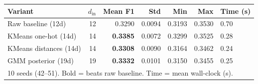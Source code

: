 \begin{tabular}{lrrrrrl}
\toprule
Variant & $d_{\mathrm{in}}$ & Mean F1 & Std & Min & Max & Time (s) \\
\midrule
Raw baseline (12d) & 12 & 0.3290 & 0.0094 & 0.3193 & 0.3530 & 0.70 \\
\midrule
KMeans one-hot (14d) & 14 & \textbf{0.3385} & 0.0072 & 0.3299 & 0.3525 & 0.28 \\
KMeans distances (14d) & 14 & \textbf{0.3308} & 0.0090 & 0.3164 & 0.3462 & 0.24 \\
GMM posterior (19d) & 19 & \textbf{0.3332} & 0.0101 & 0.3150 & 0.3455 & 0.25 \\
\multicolumn{7}{l}{\footnotesize 10 seeds (42--51). Bold = beats raw baseline. Time = mean wall-clock (s).} \\
\bottomrule
\end{tabular}
